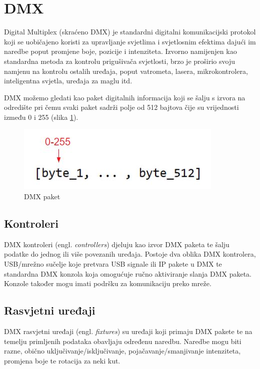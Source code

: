 \documentclass[times, utf8, zavrsni, numeric]{fer}
\begin{document}
\section{DMX}
Digital Multiplex (skraćeno DMX) je standardni digitalni komunikacijski protokol koji se uobičajeno koristi za upravljanje svjetlima i svjetlosnim efektima dajući im naredbe poput promjene boje, pozicije i intenziteta. Izvorno namijenjen kao standardna metoda za kontrolu prigušivača svjetlosti, brzo je proširio svoju namjenu na kontrolu ostalih uređaja, poput vatrometa, lasera, mikrokontrolera, inteligentna svjetla, uređaja za maglu itd. \newline

DMX možemo gledati kao paket digitalnih informacija koji se šalju s izvora na odredište pri čemu svaki paket sadrži polje od 512 bajtova čije su vrijednosti između 0 i 255 (slika \ref{fig:slika 3-1}).

\begin{figure}[htp]
	\centering
	\includegraphics[width=\linewidth]{slika 3-1.png}
	\caption{DMX paket \cite{dmx_overview}}
	\label{fig:slika 3-1}
\end{figure}

\subsection{Kontroleri}
DMX kontroleri (engl. \emph{controllers}) djeluju kao izvor DMX paketa te šalju podatke do jednog ili više povezanih uređaja. Postoje dva oblika DMX kontrolera, USB/mrežno sučelje koje pretvara USB signale ili IP pakete u DMX te standardna DMX konzola koja omogućuje ručno aktiviranje slanja DMX paketa. Konzole također mogu imati podršku za komunikaciju preko mreže.

\subsection{Rasvjetni uređaji}
DMX rasvjetni uređaji (engl. \emph{fixtures}) su uređaji koji primaju DMX pakete te na temelju primljenih podataka obavljaju određenu naredbu. Naredbe mogu biti razne, obično uključivanje/isključivanje, pojačavanje/smanjivanje intenziteta, promjena boje te rotacija za neki kut. \newline
\end{document}
